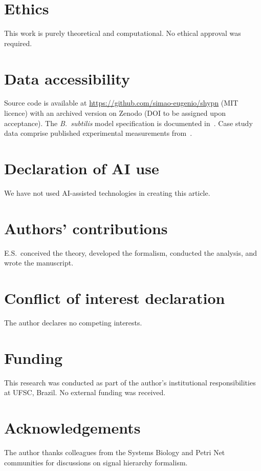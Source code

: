 \documentclass[11pt,a4paper]{article}
\theoremstyle{plain}
\theoremstyle{definition}
\begin{document}
\section*{Ethics}
This work is purely theoretical and computational. No ethical approval was required.

\section*{Data accessibility}
Source code is available at \url{https://github.com/simao-eugenio/shypn} (MIT licence) with an archived version on Zenodo (DOI to be assigned upon acceptance). The \textit{B.~subtilis} model specification is documented in~\cite{subtilis2026}. Case study data comprise published experimental measurements from~\cite{fujita2005}.

\section*{Declaration of AI use}
We have not used AI-assisted technologies in creating this article.

\section*{Authors' contributions}
E.S.\ conceived the theory, developed the formalism, conducted the analysis, and wrote the manuscript.

\section*{Conflict of interest declaration}
The author declares no competing interests.

\section*{Funding}
This research was conducted as part of the author's institutional responsibilities at UFSC, Brazil. No external funding was received.

\section*{Acknowledgements}
The author thanks colleagues from the Systems Biology and Petri Net communities for discussions on signal hierarchy formalism.



\end{document}
